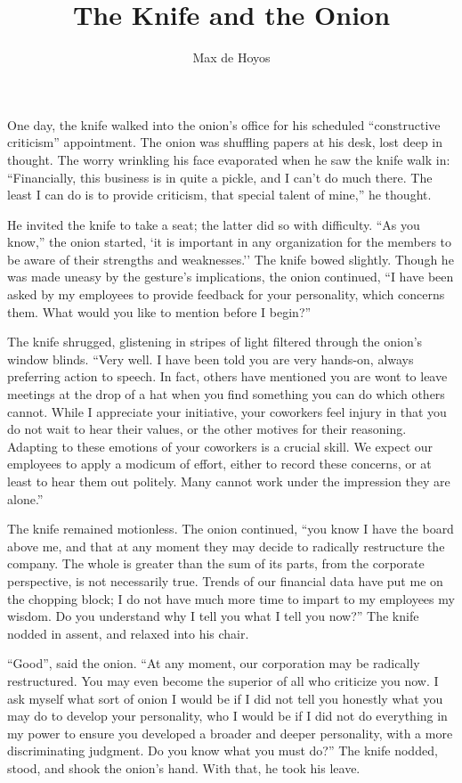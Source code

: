 \documentclass[12pt]{article}
\author{Max de Hoyos}
\title{The Knife and the Onion}
\begin{document}
\maketitle


One day, the knife walked into the onion's office for his scheduled ``constructive criticism'' appointment. The onion was shuffling papers at his desk, lost deep in thought. The worry wrinkling his face evaporated when he saw the knife walk in: ``Financially, this business is in quite a pickle, and I can't do much there. The least I can do is to provide criticism, that special talent of mine,'' he thought. 

He invited the knife to take a seat; the latter did so with difficulty. ``As you know,'' the onion started, `it is important in any organization for the members to be aware of their strengths and weaknesses.'' The knife bowed slightly. Though he was made uneasy by the gesture's implications, the onion continued, ``I have been asked by my employees to provide feedback for your personality, which concerns them. What would you like to mention before I begin?'' 

The knife shrugged, glistening in stripes of light filtered through the onion's window blinds. ``Very well. I have been told you are very hands-on, always preferring action to speech. In fact, others have mentioned you are wont to leave meetings at the drop of a hat when you find something you can do which others cannot. While I appreciate your initiative, your coworkers feel injury in that you do not wait to hear their values, or the other motives for their reasoning. Adapting to these emotions of your coworkers is a crucial skill. We expect our employees to apply a modicum of effort, either to record these concerns, or at least to hear them out politely. Many cannot work under the impression they are alone.'' 

The knife remained motionless. The onion continued, ``you know I have the board above me, and that at any moment they may decide to radically restructure the company. The whole is greater than the sum of its parts, from the corporate perspective, is not necessarily true. Trends of our financial data have put me on the chopping block; I do not have much more time to impart to my employees my wisdom. Do you understand why I tell you what I tell you now?'' The knife nodded in assent, and relaxed into his chair. 

``Good'', said the onion. ``At any moment, our corporation may be radically restructured. You may even become the superior of all who criticize you now. I ask myself what sort of onion I would be if I did not tell you honestly what you may do to develop your personality, who I would be if I did not do everything in my power to ensure you developed a broader and deeper personality, with a more discriminating judgment. Do you know what you must do?'' The knife nodded, stood, and shook the onion's hand. With that, he took his leave.
\end{document}
